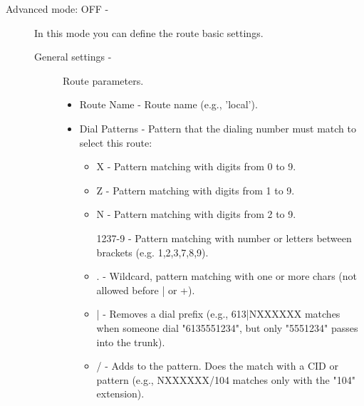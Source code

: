\begin{description}
	\item[Advanced mode: OFF -] In this mode you can define the route basic settings.
        \begin{description}
            \item[General settings -] Route parameters.
                \begin{itemize}
                    \item Route Name - Route name (e.g., 'local').
                    \item Dial Patterns - Pattern that the dialing number must match to select this route:
                        \begin{itemize}
                            \item X - Pattern matching with digits from 0 to 9.
                            \item Z - Pattern matching with digits from 1 to 9.
                            \item N - Pattern matching with digits from 2 to 9.
                            \item [1237-9] - Pattern matching with number or letters between brackets (e.g. 1,2,3,7,8,9).
                            \item . - Wildcard, pattern matching with one or more chars (not allowed before | or +).
                            \item | - Removes a dial prefix (e.g., 613|NXXXXXX matches when someone dial "6135551234", but only "5551234" passes into the trunk).
                            \item / - Adds to the pattern. Does the match with a CID or pattern (e.g., NXXXXXX/104 matches only with the "104" extension).
                        \end{itemize}
                \end{itemize}


\end{description}
\end{description}
